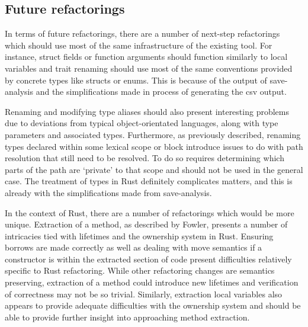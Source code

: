 \subsection{Future refactorings}
In terms of future refactorings, there are a number of next-step refactorings which should use most of the same infrastructure of the existing tool. For instance, struct fields or function arguments should function similarly to local variables and trait renaming should use most of the same conventions provided by concrete types like structs or enums. This is because of the output of save-analysis and the simplifications made in process of generating the csv output.


Renaming and modifying type aliases should also present interesting problems due to deviations from typical object-orientated languages, along with type parameters and associated types. Furthermore, as previously described, renaming types declared within some lexical scope or block introduce issues to do with path resolution that still need to be resolved. To do so requires determining which parts of the path are `private' to that scope and should not be used in the general case. The treatment of types in Rust definitely complicates matters, and this is already with the simplifications made from save-analysis.

In the context of Rust, there are a number of refactorings which would be more unique. Extraction of a method, as described by Fowler, presents a number of intricacies tied with lifetimes and the ownership system in Rust. Ensuring borrows are made correctly as well as dealing with move semantics if a constructor is within the extracted section of code present difficulties relatively specific to Rust refactoring. While other refactoring changes are semantics preserving, extraction of a method could introduce new lifetimes and verification of correctness may not be so trivial. Similarly, extraction local variables also appears to provide adequate difficulties with the ownership system and should be able to provide further insight into approaching method extraction.


